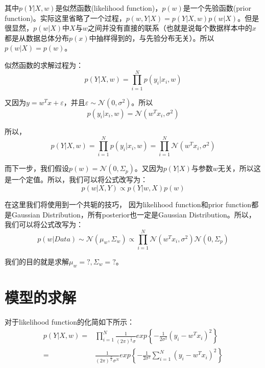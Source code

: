 \documentclass[a4paper]{article}
\begin{document}
其中$p(Y|X,w)$是似然函数(likelihood function)，$p(w)$是一个先验函数(prior function)。实际这里省略了一个过程，$p(w,Y|X)=p(Y|X,w)p(w|X)$。但是很显然，$p(w|X)$中$X$与$w$之间并没有直接的联系（也就是说每个数据样本中的$x$都是从数据总体分布$p(x)$中抽样得到的，与先验分布无关）。所以$p(w|X)=p(w)$。

似然函数的求解过程为：
\begin{equation}
    p(Y|X,w) = \prod_{i=1}^N p(y_i|x_i,w) 
\end{equation}

又因为$y=w^Tx+\varepsilon$，并且$\varepsilon \sim \mathcal{N}(0,\sigma^2)$。所以
\begin{equation}
    p(y_i|x_i,w) = \mathcal{N}(w^Tx_i,\sigma^2)
\end{equation}

所以，
\begin{equation}
    p(Y|X,w) = \prod_{i=1}^N p(y_i|x_i,w) = \prod_{i=1}^N \mathcal{N}(w^Tx_i,\sigma^2)
\end{equation}

而下一步，我们假设$p(w)=\mathcal{N}(0,\Sigma_p)$。又因为$p(Y|X)$与参数$w$无关，所以这是一个定值。所以，我们可以将公式改写为：
\begin{equation}
    p(w|X,Y) \propto p(Y|w,X)p(w) 
\end{equation}

在这里我们将使用到一个共轭的技巧，{\color{red} 因为likelihood function和prior function都是Gaussian Distribution，所有posterior也一定是Gaussian Distribution。}所以，我们可以将公式改写为：
\begin{equation}
    p(w|Data) \sim \mathcal{N}(\mu_w,\Sigma_w) \propto \prod_{i=1}^N \mathcal{N}(w^Tx_i,\sigma^2) \mathcal{N}(0,\Sigma_p)
\end{equation}

我们的目的就是求解$\mu_w = ?,\Sigma_w = ?$。

\section{模型的求解}
对于likelihood function的化简如下所示：
\begin{align}
    p(Y|X,w) 
    = & \prod_{i=1}^N \frac{1}{(2\pi)^{\frac{1}{2}}\sigma} exp\left\{ -\frac{1}{2\sigma^2}(y_i - w^Tx_i)^2 \right\} \\
    = & \frac{1}{(2\pi)^{\frac{N}{2}}\sigma^N} exp\left\{ -\frac{1}{2\sigma^2}\sum_{i=1}^N(y_i - w^Tx_i)^2 \right\}
\end{align}
\end{document}
